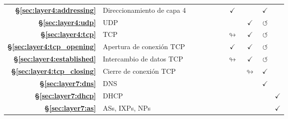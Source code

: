 {\begin{tabular}{rl ccccccccc}
    \textbf{\S\ref{sec:layer4:addressing}}  & Direccionamiento de capa 4                               &                   &                    &                    &                    &                    & $\checkmark$         &                         & $\checkmark$         &                      \\
    \rowcolor{color1!15!white}
    \textbf{\S\ref{sec:layer4:udp}}  & UDP                                              &                   &                    &                    &                    &                    &                      & $\checkmark$            & $\circlearrowleft$   &                      \\
    \textbf{\S\ref{sec:layer4:tcp}}  & TCP                                              &                   &                    &                    &                    &                    & $\looparrowright$    & $\checkmark$            & $\circlearrowleft$   &                      \\
    \rowcolor{color1!15!white}
    \textbf{\S\ref{sec:layer4:tcp_opening}}  & Apertura de conexión TCP                           &                   &                    &                    &                    &                    & $\checkmark$         & $\checkmark$            & $\circlearrowleft$   &                      \\
    \textbf{\S\ref{sec:layer4:established}}  & Intercambio de datos TCP                                &                   &                    &                    &                    &                    & $\looparrowright$    & $\checkmark$            & $\circlearrowleft$   &                      \\
    \rowcolor{color1!15!white}
    \textbf{\S\ref{sec:layer4:tcp_closing}}  & Cierre de conexión TCP                           &                   &                    &                    &                    &                    &                      & $\looparrowright$       & $\checkmark$         &                      \\
    \textbf{\S\ref{sec:layer7:dns}} & DNS                                              &                   &                    &                    &                    &                    &                      &                         & $\checkmark$         &                      \\
    \rowcolor{color1!15!white}
    \textbf{\S\ref{sec:layer7:dhcp}} & DHCP                                             &                   &                    &                    &                    &                    &                      &                         &                      & $\checkmark$         \\
    \textbf{\S\ref{sec:layer7:as}} & ASs, IXPs, NPs                                   &                   &                    &                    &                    &                    &                      &                         &                      & $\checkmark$         \\
\end{tabular}
}
